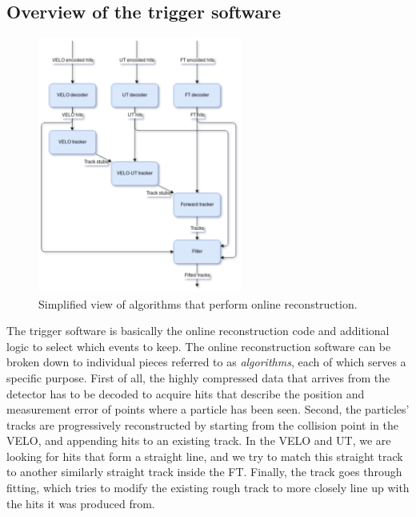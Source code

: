 \documentclass[12pt]{article}
\begin{document}
	
	\subsection{Overview of the trigger software}
	\label{intro_algos_overview}
		
	\begin{figure}[H]
		\begin{center}
			\includegraphics[width=0.6\textwidth]{algorithms_brunel}
		\end{center}
		\caption{Simplified view of algorithms that perform online reconstruction.}
		\label{fig_algorithms_brunel}
	\end{figure}


	The trigger software is basically the online reconstruction code and additional logic to select which events to keep. The online reconstruction software can be broken down to individual pieces referred to as \textit{algorithms}, each of which serves a specific purpose. First of all, the highly compressed data that arrives from the detector has to be decoded to acquire hits that describe the position and measurement error of points where a particle has been seen. Second, the particles' tracks are progressively reconstructed by starting from the collision point in the VELO, and appending hits to an existing track. In the VELO and UT, we are looking for hits that form a straight line, and we try to match this straight track to another similarly straight track inside the FT. Finally, the track goes through fitting, which tries to modify the existing rough track to more closely line up with the hits it was produced from.
	
\end{document}
